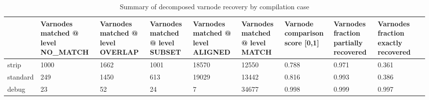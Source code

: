 \begin{table*}[t]
\centering
\caption{Summary of decomposed varnode recovery by compilation case}
\label{table*:opts-varnodes-summary-decomposed}
\begin{tabular}{lp{1.3cm}p{1.3cm}p{1.3cm}p{1.3cm}p{1.3cm}p{1.3cm}p{1.3cm}p{1.3cm}p{1.3cm}}
\toprule
{} &  Varnodes matched @ level NO\_MATCH &  Varnodes matched @ level OVERLAP &  Varnodes matched @ level SUBSET &  Varnodes matched @ level ALIGNED &  Varnodes matched @ level MATCH &  Varnode comparison score [0,1] &  Varnodes fraction partially recovered &  Varnodes fraction exactly recovered \\
\midrule
strip    &                               1000 &                              1662 &                             1001 &                             18570 &                           12550 &                           0.788 &                                  0.971 &                                0.361 \\
standard &                                249 &                              1450 &                              613 &                             19029 &                           13442 &                           0.816 &                                  0.993 &                                0.386 \\
debug    &                                 23 &                                52 &                               24 &                                 7 &                           34677 &                           0.998 &                                  0.999 &                                0.997 \\
\bottomrule
\end{tabular}
\end{table*}
